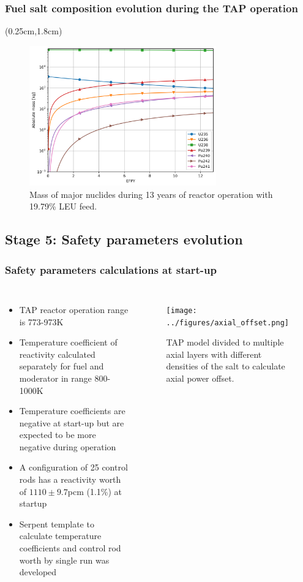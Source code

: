 \begin{frame}
\frametitle{Fuel salt composition evolution during the TAP operation}
\begin{textblock*}{12.25cm}(0.25cm,1.8cm) %
	\begin{figure}[htp!] %
		\centering
				\vspace{-3mm}
		\includegraphics[width=0.72\textwidth]{../figures/u_pu_mass.png}
		\caption{Mass of major nuclides during 13 years of reactor operation 
		with 19.79\% \gls{LEU} feed.}
	\end{figure}
\end{textblock*}
\end{frame}


\subsection{Stage 5: Safety parameters evolution}

\begin{frame}
\frametitle{Safety parameters calculations at start-up}       

\begin{columns}
	\column[t]{6cm}
	\begin{itemize}
		\item \gls{TAP} reactor operation range is 773-973K
		\item Temperature coefficient of reactivity calculated separately for 
		fuel and moderator in range 800-1000K
		\item Temperature coefficients are negative at start-up but are 
		expected to be more negative during operation
		\item A configuration of 25 control rods has a reactivity worth of 
		$1110\pm9.7$pcm (1.1\%) at startup
		\item Serpent template to calculate temperature coefficients and  
		control rod worth by single run was developed
	\end{itemize}
	
	\column[t]{6.5cm}
	\begin{figure}[bth!] %
	\texttt{[image: ../figures/axial\_offset.png]}
	\caption{\gls{TAP} model divided to multiple axial layers with different 
	densities of the salt to calculate axial power offset.}
	\end{figure}
\end{columns}
\end{frame}

